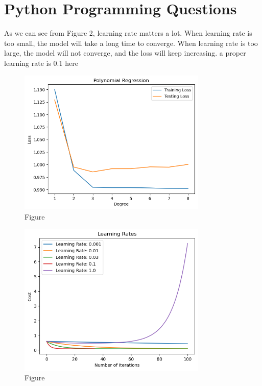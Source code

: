 \documentclass[12pt]{article}
\begin{document}
\section{Python Programming Questions}

As we can see from Figure 2, learning rate matters a lot. 
When learning rate is too small, the model will take a long time to converge. 
When learning rate is too large, the model will not converge, and the loss will keep increasing.
a proper learning rate is 0.1 here

\begin{figure}
\centering
\includegraphics[width=0.8\textwidth]{hw2fig1.png}
\caption{Figure}
\end{figure}

\begin{figure}
\centering
\includegraphics[width=0.8\textwidth]{hw2fig2.png}
\caption{Figure}
\end{figure}
\end{document}
